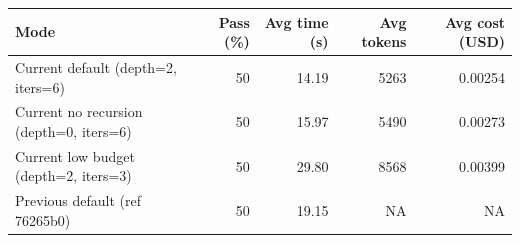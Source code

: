 \begin{tabular}{lrrrr}
\toprule
Mode & Pass (\%) & Avg time (s) & Avg tokens & Avg cost (USD) \\
\midrule
Current default (depth=2, iters=6) & 50 & 14.19 & 5263 & 0.00254 \\
Current no recursion (depth=0, iters=6) & 50 & 15.97 & 5490 & 0.00273 \\
Current low budget (depth=2, iters=3) & 50 & 29.80 & 8568 & 0.00399 \\
Previous default (ref 76265b0) & 50 & 19.15 & NA & NA \\
\bottomrule
\end{tabular}
